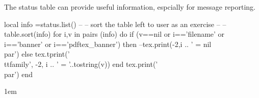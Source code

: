 The status table can provide useful information, espcially for message reporting.
\begin{multicols}{2}
\begin{luacode}
local info =status.list() 
-- 
-- sort the table left to user as an exercise
-- 
-- table.sort(info)
for i,v in pairs (info) do 
if  (v==nil or i=='filename' or i=='banner' or i=='pdftex_banner') 
   then 
      --tex.print(-2,i .. ' = nil\\par') 
   else 
      tex.tprint({'\\ttfamily'}, {-2, i .. ' =  '..tostring(v)})
   end
   tex.print('\\par')
end

\end{luacode}
\end{multicols}


\parindent1em











 